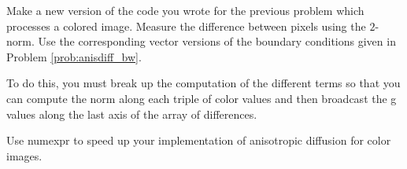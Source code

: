 \begin{problem}
Make a new version of the code you wrote for the previous problem which processes a colored image.
Measure the difference between pixels using the $2$-norm.
Use the corresponding vector versions of the boundary conditions given in Problem \ref{prob:anisdiff_bw}.

To do this, you must break up the computation of the different terms so that you can compute the norm along each triple of color values and then broadcast the g values along the last axis of the array of differences.


\end{problem}



\begin{problem}
	Use numexpr to speed up your implementation of anisotropic diffusion for color images. 
	
\end{problem}




